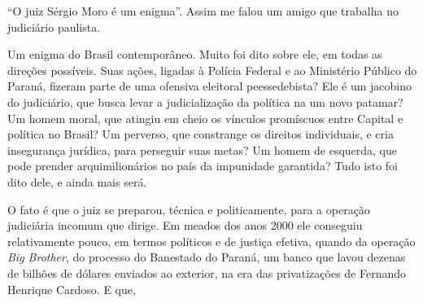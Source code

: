 ``O juiz Sérgio Moro é um enigma''. Assim me falou um amigo que trabalha
no judiciário paulista.

Um enigma do Brasil contemporâneo. Muito foi dito sobre ele, em todas as
direções possíveis. Suas ações, ligadas à Polícia Federal e ao
Ministério Público do Paraná, fizeram parte de uma ofensiva eleitoral
peessedebista? Ele é um jacobino do judiciário, que busca levar a
judicialização da política na um novo patamar? Um homem moral, que
atingiu em cheio os vínculos promíscuos entre Capital e política no
Brasil? Um perverso, que constrange os direitos individuais, e cria
insegurança jurídica, para perseguir suas metas? Um homem de esquerda,
que pode prender arquimilionários no país da impunidade garantida? Tudo
isto foi dito dele, e ainda mais será.

O fato é que o juiz se preparou, técnica e politicamente, para a
operação judiciária incomum que dirige. Em meados dos anos 2000 ele
conseguiu relativamente pouco, em termos políticos e de justiça efetiva,
quando da operação \emph{Big Brother}, do processo do Banestado do
Paraná, um banco que lavou dezenas de bilhões de dólares enviados ao
exterior, na era das privatizações de Fernando Henrique Cardoso. E que,
